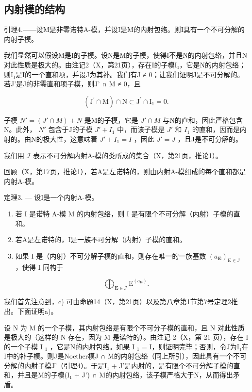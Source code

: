 \subsection{内射模的结构}

引理4.——设M是非零诺特A-模，并设I是M的内射包络。则I具有一个不可分解的内射子模。

我们显然可以假设M是I的子模。设N是M的子模，使得I不是N的内射包络，并且N对此性质是极大的。由注记2（X，第21页），存在I的子模I₁，它是N的内射包络；则I₁是I的一个直和项，并设J为其补。我们有J ≠ 0；让我们证明J是不可分解的。若J'是J的非零直和项子模，则J' ∩ M ≠ 0，且

\[
\left(\mathrm{J} ^ {\prime} \cap \mathrm{M}\right) \cap \mathrm{N} \subset \mathrm{J} ^ {\prime} \cap \mathrm{I} _ {1} = 0.
\]

子模 \(N' = (J' \cap M) + N\) 是M的子模，它是 \(J' \cap M\) 与N的直和，因此严格包含N。此外， \(N'\) 包含于J的子模 \(J' + I_{1}\) 中，而该子模是 \(J'\) 和 \(I_{1}\) 的直和，因而是内射的。由N的极大性，这意味着 \(J' + I_{1} = I\) ，因此 \(J' = J\) ，且J是不可分解的。

我们用 \(\mathcal{I}\) 表示不可分解内射A-模的类所成的集合（X，第21页，推论1）。

回顾（X，第17页，推论1），若A是左诺特的，则由内射A-模组成的每个直和都是内射A-模。

定理3. --- 设I是一个内射A-模。

\begin{enumerate}
\def\labelenumi{\alph{enumi})}
\item
  若 I 是诺特 A-模 M 的内射包络，则 I 是有限个不可分解（内射）子模的直和。
\item
  若A是左诺特的，I是一族不可分解（内射）子模的直和。
\item
  如果 I 是（内射）不可分解子模的直和，则存在唯一的一族基数 \((a_{\mathbf{E}})_{\mathbf{E}\in\mathcal{I}}\) ，使得 I 同构于
\end{enumerate}

\[
\bigoplus_ {\mathbf {E} \in \mathcal {I}} \mathrm{E} ^ {(a _ {\mathbf {E}})}.
\]

我们首先注意到，c) 可由命题14（X，第21页）以及第八章第1节第7号定理2推出。下面证明a)。

设 N 为 M 的一个子模，其内射包络是有限个不可分子模的直和，且 N 对此性质是极大的（这样的 N 存在，因为 M 是诺特的）。由注记 2（X，第 21 页），存在 I 的一个子模 I \(_{1}\) ，它是N的内射包络。如果 I \(_{1}\) = I，则证明完毕；否则，令J为I₁在I中的补子模。则J是Noether模J ∩ M的内射包络（同上所引），因此具有一个不可分解的内射子模J'（引理4）。于是I₁ + J'是内射的，是有限个不可分解子模的直和，并且是M的子模(I₁ + J') ∩ M的内射包络，该子模严格大于N，从而得出矛盾。

